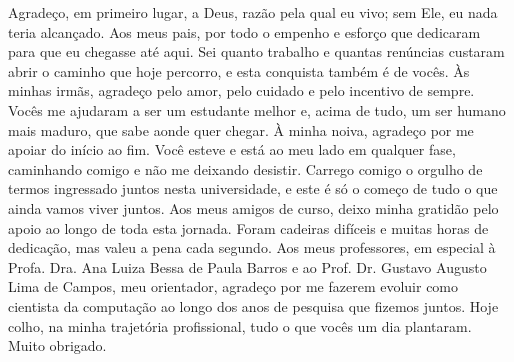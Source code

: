 \begin{agradecimentos}
  \setlength{\parindent}{0pt}
  Agradeço, em primeiro lugar, a Deus, razão pela qual eu vivo; sem Ele,
  eu nada teria alcançado. Aos meus pais, por todo o empenho e esforço que
  dedicaram para que eu chegasse até aqui. Sei quanto trabalho e quantas
  renúncias custaram abrir o caminho que hoje percorro, e esta conquista
  também é de vocês. Às minhas irmãs, agradeço pelo amor, pelo cuidado e
  pelo incentivo de sempre. Vocês me ajudaram a ser um estudante melhor e,
  acima de tudo, um ser humano mais maduro, que sabe aonde quer chegar. À
  minha noiva, agradeço por me apoiar do início ao fim. Você esteve e está
  ao meu lado em qualquer fase, caminhando comigo e não me deixando
  desistir. Carrego comigo o orgulho de termos ingressado juntos nesta
  universidade, e este é só o começo de tudo o que ainda vamos viver
  juntos. Aos meus amigos de curso, deixo minha gratidão pelo apoio ao
  longo de toda esta jornada. Foram cadeiras difíceis e muitas horas de
  dedicação, mas valeu a pena cada segundo. Aos meus professores, em
  especial à Profa. Dra. Ana Luiza Bessa de Paula Barros e ao Prof. Dr.
  Gustavo Augusto Lima de Campos, meu orientador, agradeço por me fazerem
  evoluir como cientista da computação ao longo dos anos de pesquisa que
  fizemos juntos. Hoje colho, na minha trajetória profissional, tudo o que
  vocês um dia plantaram. Muito obrigado.
\end{agradecimentos}
